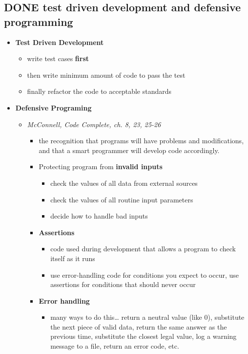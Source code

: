 \documentclass[11pt]{article}
\begin{document}
\subsection{{\bfseries\sffamily DONE} test driven development and defensive programming}
\label{sec-3-3}
\begin{itemize}
\item \textbf{Test Driven Development}
\begin{itemize}
\item write test cases \textbf{first}
\item then write minimum amount of code to pass the test
\item finally refactor the code to acceptable standards
\end{itemize}
\item \textbf{Defensive Programing}
\begin{itemize}
\item \emph{McConnell, Code Complete, ch. 8, 23, 25-26}
\begin{itemize}
\item the recognition that programs will have problems and modifications, and that a smart programmer will develop code accordingly.
\item Protecting program from \textbf{invalid inputs}
\begin{itemize}
\item check the values of all data from external sources
\item check the values of all routine input parameters
\item decide how to handle bad inputs
\end{itemize}
\item \textbf{Assertions}
\begin{itemize}
\item code used during development that allows a program to check itself as it runs
\item use error-handling code for conditions you expect to occur, use assertions for conditions that should never occur
\end{itemize}
\item \textbf{Error handling}
\begin{itemize}
\item many ways to do this\ldots{} return a neutral value (like 0), substitute the next piece of valid data, return the same answer as the previous time, substitute the closest legal value, log a warning message to a file, return an error code, etc.
\end{itemize}

\end{itemize}
\end{itemize}
\end{itemize}
\end{document}
